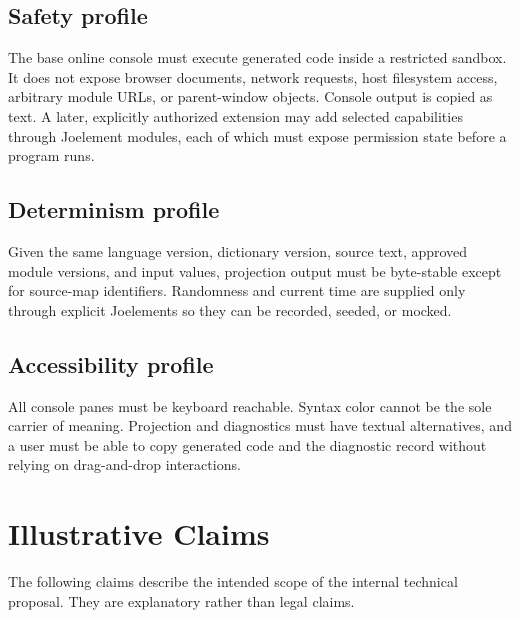 \documentclass[12pt]{article}
\begin{document}
\subsection{Safety profile}
The base online console must execute generated code inside a restricted sandbox. It does not expose browser documents, network requests, host filesystem access, arbitrary module URLs, or parent-window objects. Console output is copied as text. A later, explicitly authorized extension may add selected capabilities through Joelement modules, each of which must expose permission state before a program runs.

\subsection{Determinism profile}
Given the same language version, dictionary version, source text, approved module versions, and input values, projection output must be byte-stable except for source-map identifiers. Randomness and current time are supplied only through explicit Joelements so they can be recorded, seeded, or mocked.

\subsection{Accessibility profile}
All console panes must be keyboard reachable. Syntax color cannot be the sole carrier of meaning. Projection and diagnostics must have textual alternatives, and a user must be able to copy generated code and the diagnostic record without relying on drag-and-drop interactions.

\clearpage
\section{Illustrative Claims}
The following claims describe the intended scope of the internal technical proposal. They are explanatory rather than legal claims.
\end{document}
